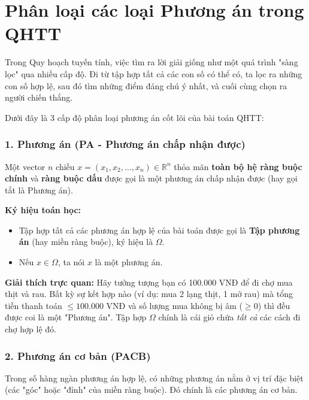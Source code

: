 
\section{Phân loại các loại Phương án trong QHTT}
Trong Quy hoạch tuyến tính, việc tìm ra lời giải giống như một quá trình "sàng lọc" qua nhiều cấp độ. Đi từ tập hợp tất cả các con số có thể có, ta lọc ra những con số hợp lệ, sau đó tìm những điểm đáng chú ý nhất, và cuối cùng chọn ra người chiến thắng. 

Dưới đây là 3 cấp độ phân loại phương án cốt lõi của bài toán QHTT:

\subsubsection{1. Phương án (PA - Phương án chấp nhận được)}
\begin{definition}[Phương án]
Một vector $n$ chiều $x = (x_1, x_2, \dots, x_n) \in \mathbb{R}^n$ thỏa mãn \textbf{toàn bộ hệ ràng buộc chính} và \textbf{ràng buộc dấu} được gọi là một phương án chấp nhận được (hay gọi tắt là Phương án).
\end{definition}

\textbf{Ký hiệu toán học:}
\begin{itemize}
    \item Tập hợp tất cả các phương án hợp lệ của bài toán được gọi là \textbf{Tập phương án} (hay miền ràng buộc), ký hiệu là $\Omega$. 
    \item Nếu $x \in \Omega$, ta nói $x$ là một phương án.
\end{itemize}

\textbf{Giải thích trực quan:} 
Hãy tưởng tượng bạn có 100.000 VNĐ để đi chợ mua thịt và rau. Bất kỳ sự kết hợp nào (ví dụ: mua 2 lạng thịt, 1 mớ rau) mà tổng tiền thanh toán $\le 100.000$ VNĐ và số lượng mua không bị âm ($\ge 0$) thì đều được coi là một "Phương án". Tập hợp $\Omega$ chính là cái giỏ chứa \textit{tất cả} các cách đi chợ hợp lệ đó.

\subsubsection{2. Phương án cơ bản (PACB)}
Trong số hàng ngàn phương án hợp lệ, có những phương án nằm ở vị trí đặc biệt (các "góc" hoặc "đỉnh" của miền ràng buộc). Đó chính là các phương án cơ bản.


